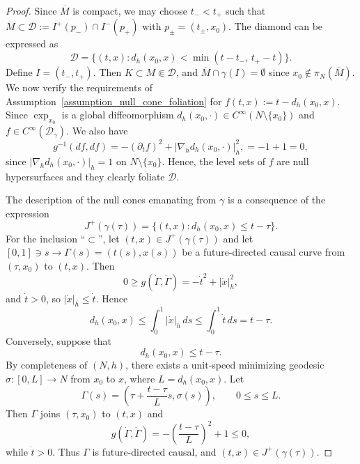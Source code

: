 \documentclass[12pt,reqno]{amsart}
\numberwithin{equation}{section}
\theoremstyle{definition}
\theoremstyle{plain}
\theoremstyle{definition}
\theoremstyle{definition}
\newcommand{\D}{\mathcal{D}}
\newcommand{\dg}{\D_\gamma}
\newcommand{\uu}{M}
\begin{document}
\begin{proof}
Since $\overline\uu$ is compact, we may choose
$t_-<t_+$ such that $\overline\uu\subset\mathcal{D}:=I^+(p_-)\cap I^-(p_+)$ with
$p_\pm=(t_\pm,x_0)$.
The diamond can be expressed as
\[
  \mathcal{D}=\bigl\{(t,x):d_h(x_0,x)<\min(t-t_-,\,t_+-t)\bigr\}.
\]
Define $I=(t_-,t_+)$. Then $K\subset\uu\Subset\D$, and $\overline{\uu}\cap\gamma(I)=\emptyset$ since $x_0\notin\pi_N(\overline\uu)$. We now verify the requirements of Assumption~\ref{assumption_null_cone_foliation} for $f(t,x):=t-d_h(x_0,x)$. Since $\exp_{x_0}$ is a global diffeomorphism $d_h(x_0,\cdot)\in C^\infty(N\setminus\{x_0\})$ and $f\in C^\infty(\dg)$. We also have
\[
  g^{-1}(df,df)
  =-(\partial_t f)^2+|\nabla_h d_h(x_0,\cdot)|_h^2,
  =-1+1=0,
\]
since $|\nabla_h d_h(x_0,\cdot)|_h=1$ on $N\setminus\{x_0\}$. Hence, the level sets of $f$ are null hypersurfaces and they clearly foliate $\D$.

The description of the null cones emanating from $\gamma$ is a consequence of the expression
\[
J^+(\gamma(\tau))
=
\{(t,x):d_h(x_0,x)\leq t-\tau\}.
\]
For the inclusion ``$\subset$'', let $(t,x)\in J^+(\gamma(\tau))$ and let
$[0,1] \ni s \to \Gamma(s)=(t(s),x(s))$ be a future-directed causal curve from
$(\tau,x_0)$ to $(t,x)$. Then
\[
0\geq g(\dot\Gamma,\dot\Gamma)
=-\dot t^2+|\dot x|_h^2,
\]
and $\dot t>0$, so $|\dot x|_h\leq\dot t$. Hence
\[
d_h(x_0,x) \leq
\int_0^1 |\dot x|_h\,ds
\leq\int_0^1 \dot t\,ds
=t-\tau.
\]
Conversely, suppose that
\[
d_h(x_0,x)\leq t-\tau.
\]
By completeness of $(N,h)$, there exists a unit-speed minimizing
geodesic $\sigma:[0,L]\to N$ from $x_0$ to $x$, where
$L=d_h(x_0,x)$. Let
\[
\Gamma(s)=
\left(\tau+\frac{t-\tau}{L}s,\sigma(s)\right),
\qquad 0\leq s\leq L.
\]
Then $\Gamma$ joins $(\tau,x_0)$ to $(t,x)$ and
\[
g(\dot\Gamma,\dot\Gamma)
=-\left(\frac{t-\tau}{L}\right)^2+1\leq0,
\]
while $\dot t>0$. Thus $\Gamma$ is future-directed causal, and
$(t,x)\in J^+(\gamma(\tau))$.
\end{proof}
\end{document}
